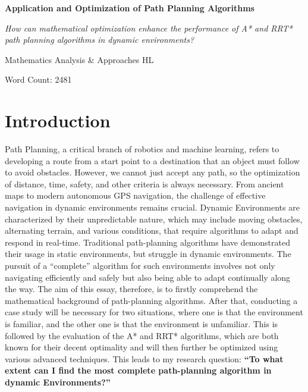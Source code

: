 \documentclass[12pt]{article}
\begin{document}
\begin{titlepage}
    \centering
    
    {\Huge\bfseries Application and Optimization of Path Planning Algorithms\par}
    
    \vspace{1in}
    
    {\Large\itshape How can mathematical optimization enhance the performance of A* and RRT* path planning algorithms in dynamic environments?\par}
    
    \vspace{1in}
    
    {\Large Mathematics Analysis \& Approaches HL\par}

    \vspace{1in}
    
    {\Large Word Count: 2481\par} %

\end{titlepage}
\tableofcontents

\newpage
\section{Introduction}
Path Planning, a critical branch of robotics and machine learning, refers to developing a route from a start point to a destination that an object must follow to avoid obstacles. However, we cannot just accept any path, so the optimization of distance, time, safety, and other criteria is always necessary. 
From ancient maps to modern autonomous GPS navigation, the challenge of effective navigation in dynamic environments remains crucial. Dynamic Environments are characterized by their unpredictable nature, which may include moving obstacles, alternating terrain, and various conditions, that require algorithms to adapt and respond in real-time. Traditional path-planning algorithms have demonstrated their usage in static environments, but struggle in dynamic environments. 
The pursuit of a “complete” algorithm for such environments involves not only navigating efficiently and safely but also being able to adapt continually along the way. The aim of this essay, therefore, is to firstly comprehend the mathematical background of path-planning algorithms. After that, conducting a case study will be necessary for two situations, where one is that the environment is familiar, and the other one is that the environment is unfamiliar. This is followed by the evaluation of the A* and RRT* algorithms, which are both known for their decent optimality and will then further be optimized using various advanced techniques. This leads to my research question: \textbf{“To what extent can I find the most complete path-planning algorithm in dynamic Environments?”}
\end{document}
